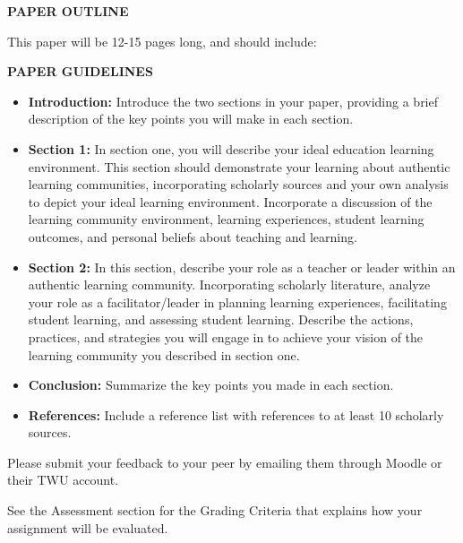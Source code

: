 \documentclass[
]{book}
\providecommand{\tightlist}{%
  \setlength{\itemsep}{0pt}\setlength{\parskip}{0pt}}
\begin{document}
\begin{assessment}
\textbf{PAPER OUTLINE}

This paper will be 12-15 pages long, and should include:


\textbf{PAPER GUIDELINES}

\begin{itemize}
\tightlist
\item
  \textbf{Introduction:} Introduce the two sections in your paper,
  providing a brief description of the key points you will make in each
  section.
\item
  \textbf{Section 1:} In section one, you will describe your ideal
  education learning environment. This section should demonstrate your
  learning about authentic learning communities, incorporating scholarly
  sources and your own analysis to depict your ideal learning
  environment. Incorporate a discussion of the learning community
  environment, learning experiences, student learning outcomes, and
  personal beliefs about teaching and learning.
\item
  \textbf{Section 2:} In this section, describe your role as a teacher
  or leader within an authentic learning community. Incorporating
  scholarly literature, analyze your role as a facilitator/leader in
  planning learning experiences, facilitating student learning, and
  assessing student learning. Describe the actions, practices, and
  strategies you will engage in to achieve your vision of the learning
  community you described in section one.
\item
  \textbf{Conclusion:} Summarize the key points you made in each
  section.
\item
  \textbf{References:} Include a reference list with references to at
  least 10 scholarly sources.
\end{itemize}

Please submit your feedback to your peer by emailing them through Moodle
or their TWU account.

See the Assessment section for the Grading Criteria that explains how
your assignment will be evaluated.
\end{assessment}
\end{document}
